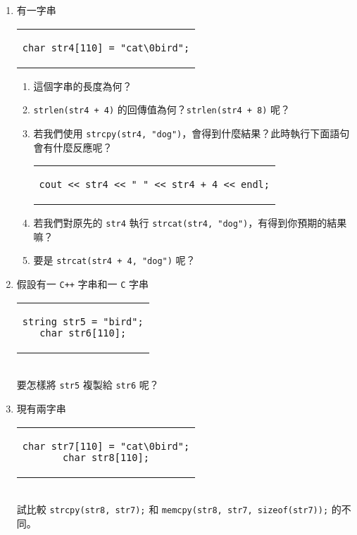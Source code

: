 \documentclass[12pt,a4paper,oneside]{article}
\begin{document}
\begin{CJK}{UTF8}{bkai}
\begin{enumerate}
\begin{enumerate}
  \end{enumerate}
\item 有一字串
\begin{code}[h!]
  \centering
  \begin{tabular}{c}
  \begin{lstlisting}
char str4[110] = "cat\0bird";
  \end{lstlisting}
  \end{tabular}
\end{code}
  \begin{enumerate}
  \item 這個字串的長度為何？
  \item \lstinline!strlen(str4 + 4)! 的回傳值為何？\lstinline!strlen(str4 + 8)! 呢？
  \item 若我們使用 \lstinline!strcpy(str4, "dog")!，會得到什麼結果？此時執行下面語句會有什麼反應呢？
  \begin{code}[h!]
    \centering
    \begin{tabular}{c}
    \begin{lstlisting}
cout << str4 << " " << str4 + 4 << endl;
    \end{lstlisting}
    \end{tabular}
  \end{code}
  \item 若我們對原先的 \lstinline!str4! 執行 \lstinline!strcat(str4, "dog")!，有得到你預期的結果嘛？
  \item 要是 \lstinline!strcat(str4 + 4, "dog")! 呢？
  \end{enumerate}
\item 假設有一 \texttt{C++} 字串和一 \texttt{C} 字串
\begin{code}[h!]
  \centering
  \begin{tabular}{c}
  \begin{lstlisting}
string str5 = "bird";
char str6[110];
  \end{lstlisting}
  \end{tabular}
\end{code}
\\要怎樣將 \lstinline!str5! 複製給 \lstinline!str6! 呢？
\item 現有兩字串
\begin{code}[h!]
  \centering
  \begin{tabular}{c}
  \begin{lstlisting}
char str7[110] = "cat\0bird";
char str8[110];
  \end{lstlisting}
  \end{tabular}
\end{code}
\\試比較 \lstinline!strcpy(str8, str7);! 和 \lstinline!memcpy(str8, str7, sizeof(str7));! 的不同。
\end{enumerate}


\end{CJK}
\end{document}

